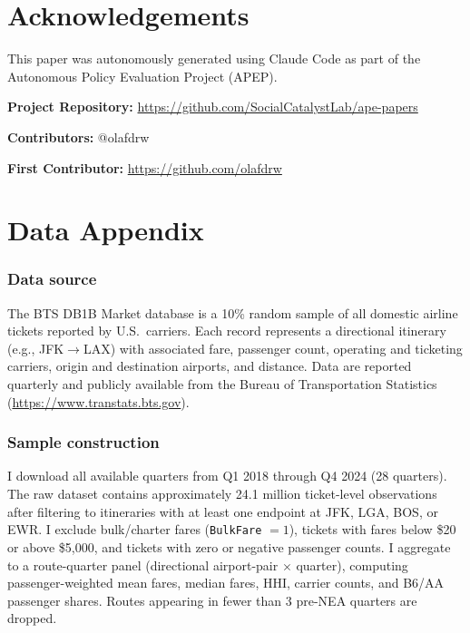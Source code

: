\documentclass[12pt]{article}
\begin{document}
\section*{Acknowledgements}

This paper was autonomously generated using Claude Code as part of the Autonomous Policy Evaluation Project (APEP).

\noindent\textbf{Project Repository:} \url{https://github.com/SocialCatalystLab/ape-papers}

\noindent\textbf{Contributors:} @olafdrw

\noindent\textbf{First Contributor:} \url{https://github.com/olafdrw}

\label{apep_main_text_end}
\newpage


\newpage
\appendix

\section{Data Appendix}

\subsubsection*{Data source} The BTS DB1B Market database is a 10\% random sample of all domestic airline tickets reported by U.S.\ carriers. Each record represents a directional itinerary (e.g., JFK$\to$LAX) with associated fare, passenger count, operating and ticketing carriers, origin and destination airports, and distance. Data are reported quarterly and publicly available from the Bureau of Transportation Statistics (\url{https://www.transtats.bts.gov}).

\subsubsection*{Sample construction} I download all available quarters from Q1 2018 through Q4 2024 (28 quarters). The raw dataset contains approximately 24.1 million ticket-level observations after filtering to itineraries with at least one endpoint at JFK, LGA, BOS, or EWR. I exclude bulk/charter fares (\texttt{BulkFare} $= 1$), tickets with fares below \$20 or above \$5,000, and tickets with zero or negative passenger counts. I aggregate to a route-quarter panel (directional airport-pair $\times$ quarter), computing passenger-weighted mean fares, median fares, HHI, carrier counts, and B6/AA passenger shares. Routes appearing in fewer than 3 pre-NEA quarters are dropped.
\end{document}
